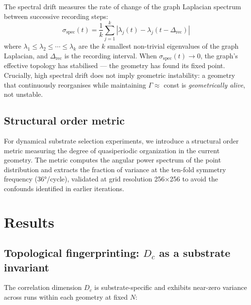 \documentclass[12pt,a4paper]{article}
\theoremstyle{plain}
\theoremstyle{definition}
\begin{document}
The spectral drift measures the rate of change of the graph Laplacian
spectrum between successive recording steps:
\begin{equation}
\sigma_{\text{spec}}(t) = \frac{1}{k}\sum_{j=1}^{k}
  |\lambda_j(t) - \lambda_j(t - \Delta_{\text{rec}})|
\end{equation}
where $\lambda_1 \leq \lambda_2 \leq \cdots \leq \lambda_k$ are the
$k$ smallest non-trivial eigenvalues of the graph Laplacian, and
$\Delta_{\text{rec}}$ is the recording interval. When
$\sigma_{\text{spec}}(t) \to 0$, the graph's effective topology has
stabilised --- the geometry has found its fixed point. Crucially, high
spectral drift does not imply geometric instability: a geometry that
continuously reorganises while maintaining $\Gamma \approx$ const is
\emph{geometrically alive}, not unstable.

\subsection{Structural order metric}

For dynamical substrate selection experiments, we introduce a structural
order metric measuring the degree of quasiperiodic organization in the
current geometry. The metric computes the angular power spectrum of the
point distribution and extracts the fraction of variance at the
ten-fold symmetry frequency (36°/cycle), validated at grid resolution
256×256 to avoid the confounds identified in earlier iterations.

\section{Results}
\label{sec:results}

\subsection{Topological fingerprinting: $D_c$ as a substrate invariant}

The correlation dimension $D_c$ is substrate-specific and exhibits
near-zero variance across runs within each geometry at fixed $N$:
\end{document}
